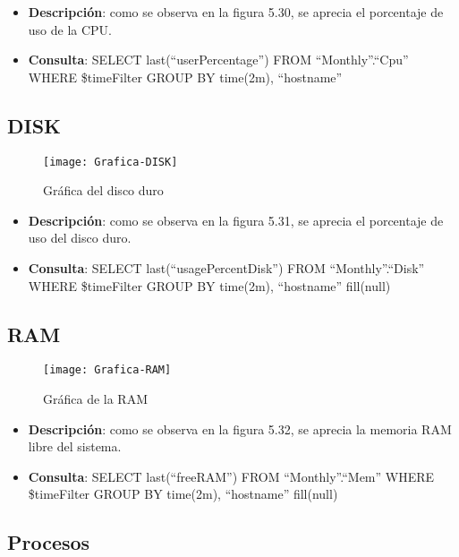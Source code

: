 \documentclass[ spanish, a4paper, 12pt, oneside]{report}
\begin{document}
\begin{itemize}
   \item \textbf{Descripción}: como se observa en la figura 5.30, se aprecia el porcentaje de uso de la CPU. 
   \item \textbf{Consulta}: SELECT last(``userPercentage'') FROM ``Monthly''.``Cpu'' WHERE \$timeFilter GROUP BY time(2m), ``hostname''
\end{itemize}


\subsection{DISK}

\begin{figure}[!h]
   \centering
   \texttt{[image: Grafica-DISK]}\\
      \caption{\label{fig: Gráfica del disco duro} Gráfica del disco duro}
\end{figure}

\begin{itemize}
   \item \textbf{Descripción}: como se observa en la figura 5.31, se aprecia el porcentaje de uso del disco duro. 
   \item \textbf{Consulta}: SELECT last(``usagePercentDisk'') FROM ``Monthly''.``Disk'' WHERE \$timeFilter GROUP BY time(2m), ``hostname'' fill(null)
\end{itemize}

\subsection{RAM}

\begin{figure}[!h]
   \centering
   \texttt{[image: Grafica-RAM]}\\
      \caption{\label{fig: Gráfica de la RAM} Gráfica de la RAM}
\end{figure}

\begin{itemize}
   \item \textbf{Descripción}: como se observa en la figura 5.32, se aprecia la memoria RAM libre del sistema.
   \item \textbf{Consulta}: SELECT last(``freeRAM'') FROM ``Monthly''.``Mem'' WHERE \$timeFilter GROUP BY time(2m), ``hostname'' fill(null)
\end{itemize}

\subsection{Procesos}
\end{document}
